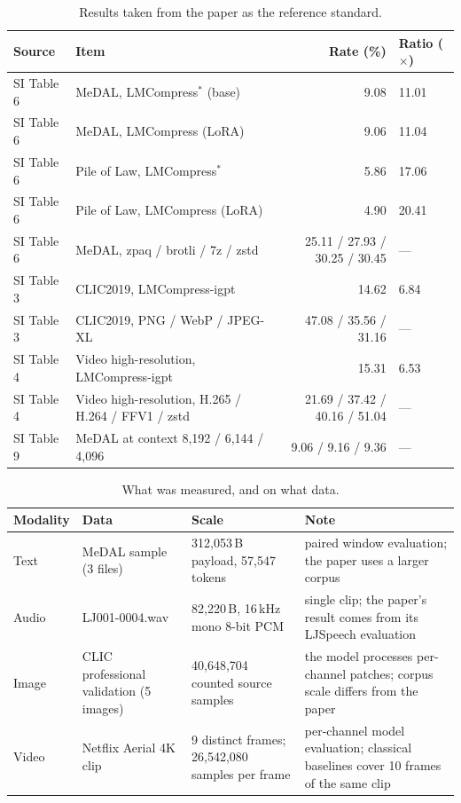 \documentclass[12pt,a4paper]{article}
\begin{document}
\begin{table}[htbp]\centering\small
\caption{Results taken from the paper as the reference standard.}
\begin{tabular}{@{}llrl@{}}
\toprule
Source & Item & Rate (\%) & Ratio ($\times$) \\
\midrule
SI Table 6 & MeDAL, LMCompress$^{*}$ (base) & 9.08 & 11.01 \\
SI Table 6 & MeDAL, LMCompress (LoRA) & 9.06 & 11.04 \\
SI Table 6 & Pile of Law, LMCompress$^{*}$ & 5.86 & 17.06 \\
SI Table 6 & Pile of Law, LMCompress (LoRA) & 4.90 & 20.41 \\
SI Table 6 & MeDAL, zpaq / brotli / 7z / zstd & 25.11 / 27.93 / 30.25 / 30.45 & --- \\
SI Table 3 & CLIC2019, LMCompress-igpt & 14.62 & 6.84 \\
SI Table 3 & CLIC2019, PNG / WebP / JPEG-XL & 47.08 / 35.56 / 31.16 & --- \\
SI Table 4 & Video high-resolution, LMCompress-igpt & 15.31 & 6.53 \\
SI Table 4 & Video high-resolution, H.265 / H.264 / FFV1 / zstd & 21.69 / 37.42 / 40.16 / 51.04 & --- \\
SI Table 9 & MeDAL at context 8{,}192 / 6{,}144 / 4{,}096 & 9.06 / 9.16 / 9.36 & --- \\
\bottomrule
\end{tabular}
\end{table}

\begin{table}[htbp]\centering\small
\caption{What was measured, and on what data.}
\begin{tabular}{@{}p{1.6cm}p{3.4cm}p{3.6cm}p{5.0cm}@{}}
\toprule
Modality & Data & Scale & Note \\
\midrule
Text & MeDAL sample (3 files) & 312{,}053\,B payload, 57{,}547 tokens & paired window evaluation; the paper uses a larger corpus \\
Audio & LJ001-0004.wav & 82{,}220\,B, 16\,kHz mono 8-bit PCM & single clip; the paper's result comes from its LJSpeech evaluation \\
Image & CLIC professional validation (5 images) & 40{,}648{,}704 counted source samples & the model processes per-channel patches; corpus scale differs from the paper \\
Video & Netflix Aerial 4K clip & 9 distinct frames; 26{,}542{,}080 samples per frame & per-channel model evaluation; classical baselines cover 10 frames of the same clip \\
\bottomrule
\end{tabular}
\end{table}
\end{document}
